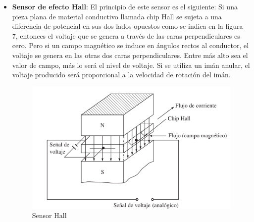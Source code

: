 \begin{itemize}
	
	\item \textbf{Sensor de efecto Hall}: El  principio de este sensor es el siguiente: Si una pieza plana de material conductivo llamada chip Hall se sujeta a una diferencia de potencial en sus dos lados opuestos como se indica en la figura 7, entonces el voltaje que se genera a través de las caras perpendiculares es cero. Pero si un campo magnético se induce en ángulos rectos al conductor, el voltaje se genera en las otras dos caras perpendiculares. Entre más alto sea el valor de campo, más lo será el nivel de voltaje. Si se utiliza un imán anular, el voltaje producido será proporcional a la velocidad de rotación del imán. 
	\begin{figure}[h]
		\centering
		\includegraphics[width=\textwidth]{img/sensorhall.png}
		\caption{Sensor Hall}
	\end{figure}
	
\end{itemize}

